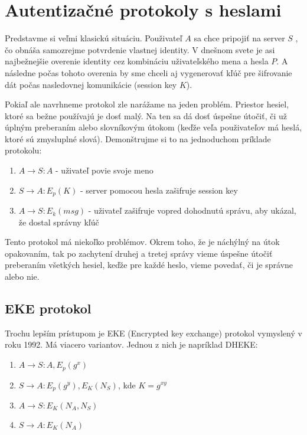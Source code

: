 \section{Autentizačné protokoly s heslami}

Predstavme si veľmi klasickú situáciu. Použivateľ $A$ sa chce pripojiť
na server $S$ , čo obnáša samozrejme potvrdenie vlastnej identity.
V dnešnom svete je asi najbežnejšie overenie identity cez kombináciu
uživateľského mena a hesla $P$. A následne počas tohoto overenia
by sme chceli aj vygenerovať kľúč pre šifrovanie dát počas nasledovnej
komunikácie (session key $K$).

Pokiaľ ale navrhneme protokol zle narážame na jeden problém. Priestor
hesiel, ktoré sa bežne používajú je dosť malý. Na ten sa dá dosť úspešne
útočiť, či už úplným preberaním alebo slovníkovým útokom (keďže veľa použivateľov
má heslá, ktoré sú zmysluplné slová). Demonštrujme si to na jednoduchom
príklade protokolu:
\begin{enumerate}
\item $A \to S\colon A$ - uživateľ povie svoje meno
\item $S \to A\colon E_p(K)$ - server pomocou hesla zašifruje session key
\item $A \to S\colon E_k(msg)$ - uživateľ zašifruje vopred dohodnutú správu, aby ukázal, že dostal správny kľúč
\end{enumerate}

Tento protokol má niekoľko problémov. Okrem toho, že je náchýlný
na útok opakovaním, tak po zachytení druhej a tretej správy vieme úspešne útočiť
preberaním všetkých hesiel, keďže pre každé heslo, vieme povedať, či je správne alebo nie.

\subsection{EKE protokol}

Trochu lepším prístupom je EKE (Encrypted key exchange) protokol vymyslený 
v roku 1992. Má viacero variantov. Jednou z nich je napríklad DHEKE:

\begin{enumerate}
\item $A\to S\colon A, E_p(g^x)$
\item $S\to A\colon E_p(g^y), E_K(N_S)$, kde $K = g^{xy}$
\item $A\to S\colon E_K(N_A, N_S)$
\item $S\to A\colon E_K(N_A)$
\end{enumerate}

